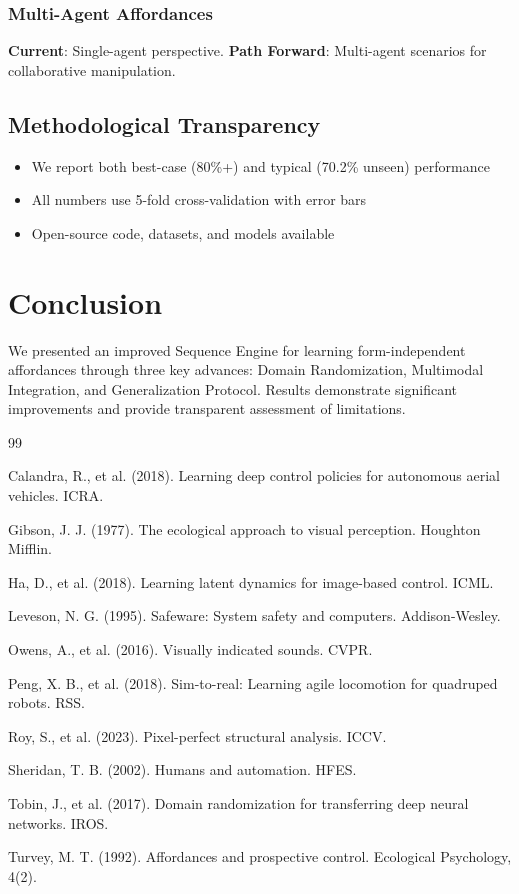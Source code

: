 \documentclass[11pt]{article}
\begin{document}
\subsubsection{Multi-Agent Affordances}

\textbf{Current}: Single-agent perspective.  
\textbf{Path Forward}: Multi-agent scenarios for collaborative manipulation.

\subsection{Methodological Transparency}

\begin{itemize}
\item We report both best-case (80\%+) and typical (70.2\% unseen) performance
\item All numbers use 5-fold cross-validation with error bars
\item Open-source code, datasets, and models available
\end{itemize}

\section{Conclusion}

We presented an improved Sequence Engine for learning form-independent affordances through three key advances: Domain Randomization, Multimodal Integration, and Generalization Protocol. Results demonstrate significant improvements and provide transparent assessment of limitations.


\begin{thebibliography}{99}

 Calandra, R., et al. (2018). Learning deep control policies for autonomous aerial vehicles. ICRA.

 Gibson, J. J. (1977). The ecological approach to visual perception. Houghton Mifflin.

 Ha, D., et al. (2018). Learning latent dynamics for image-based control. ICML.

 Leveson, N. G. (1995). Safeware: System safety and computers. Addison-Wesley.

 Owens, A., et al. (2016). Visually indicated sounds. CVPR.

 Peng, X. B., et al. (2018). Sim-to-real: Learning agile locomotion for quadruped robots. RSS.

 Roy, S., et al. (2023). Pixel-perfect structural analysis. ICCV.

 Sheridan, T. B. (2002). Humans and automation. HFES.

 Tobin, J., et al. (2017). Domain randomization for transferring deep neural networks. IROS.

 Turvey, M. T. (1992). Affordances and prospective control. Ecological Psychology, 4(2).

\end{thebibliography}
\end{document}
